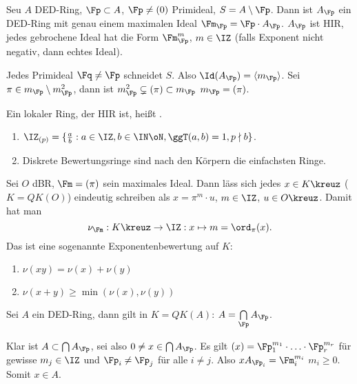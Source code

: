 \renewcommand{\lecdate}{09.12.2014}

 \begin{Folgerung}
  Seu $A$ DED-Ring, $\Fp\subset A$, $\Fp\neq(0)$ Primideal, $S=A\setminus\Fp$. Dann ist $A_\Fp$ ein DED-Ring mit genau einem maximalen Ideal $\Fm_\Fp=\Fp\cdot A_\Fp$. $A_\Fp$ ist HIR, jedes gebrochene Ideal hat die Form $\Fm_\Fp^m$, $m\in\IZ$ (falls Exponent nicht negativ, dann echtes Ideal).
 \end{Folgerung}
 
 \begin{Beweis}
  Jedes Primideal $\Fq\neq\Fp$ schneidet $S$. Also $\Id(A_\Fp)=\langle m_\Fp\rangle$. Sei $\pi\in m_\Fp\setminus m_\Fp^2$, dann ist $m_\Fp^2\subsetneq (\pi)\subset m_\Fp$ \folge $m_\Fp=(\pi)$.
 \end{Beweis}
 
 \begin{Definition}
  Ein lokaler Ring, der HIR ist, heißt .
 \end{Definition}
 
 \begin{Beispiel}
 \begin{enumerate}
  \item $\IZ_{(p)}=\{ \frac{a}{b}: a\in\IZ, b\in\IN\oN, \ggT(a,b)=1, p\nmid b\}$.
  \item Diskrete Bewertungsringe sind nach den Körpern die einfachsten Ringe.
 \end{enumerate}
 \end{Beispiel}

 \begin{Bemerkung}
  Sei $O$ dBR, $\Fm=(\pi)$ sein maximales Ideal. Dann läss sich jedes $x\in K\kreuz$ ($K=QK(O)$) eindeutig schreiben als $x=\pi^m\cdot u$, $m\in\IZ$, $u\in O\kreuz$.
  Damit hat man 
  \[ \nu_\Fm : K\kreuz \rightarrow \IZ : x\mapsto m=\ord_\pi(x).\]
  Das ist eine sogenannte Exponentenbewertung auf $K$:
  \begin{enumerate}
   \item $\nu(xy)=\nu(x)+\nu(y)$
   \item $\nu(x+y)\geq \min(\nu(x),\nu(y))$
  \end{enumerate}
 \end{Bemerkung}

 \begin{Fakt}
  Sei $A$ ein DED-Ring, dann gilt in $K=QK(A)$: $A=\bigcap\limits_{\Fp}A_\Fp$. 
 \end{Fakt}
 
 \begin{Beweis}
  Klar ist $A\subset \bigcap A_\Fp$, sei also $0\neq x\in\bigcap A_\Fp$. Es gilt $(x)=\Fp_1^{m_1}\cdot\ldots\cdot\Fp_r^{m_r}$ für gewisse $m_j\in\IZ$ und $\Fp_i\neq\Fp_j$ für alle $i\neq j$. Also $xA_{\Fp_i}=\Fm_i^{m_i}$ \folge $m_i\geq 0$. Somit $x\in A$.
 \end{Beweis}

